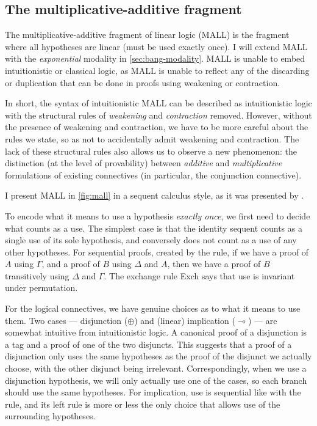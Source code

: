 \subsection{The multiplicative-additive fragment}

The multiplicative-additive fragment of linear logic (MALL) is the fragment
where all hypotheses are linear (must be used exactly once).
I will extend MALL with the \emph{exponential} modality in
\cref{sec:bang-modality}.
MALL is unable to embed intuitionistic or classical logic, as MALL is unable to
reflect any of the discarding or duplication that can be done in proofs using
weakening or contraction.

In short, the syntax of intuitionistic MALL can be described as intuitionistic
logic with the structural rules of \emph{weakening} and \emph{contraction}
removed.
However, without the presence of weakening and contraction, we have to be more
careful about the rules we state, so as not to accidentally admit weakening
and contraction.
The lack of these structural rules also allows us to observe a new phenomenon:
the distinction (at the level of provability) between \emph{additive} and
\emph{multiplicative} formulations of existing connectives (in particular, the
conjunction connective).

I present MALL in \cref{fig:mall} in a sequent calculus style, as it was
presented by \citet{girard87linear}.

To encode what it means to use a hypothesis \emph{exactly once}, we first need
to decide what counts as a use.
The simplest case is that the identity sequent counts as a single use of its
sole hypothesis, and conversely does not count as a use of any other hypotheses.
For sequential proofs, created by the  rule, if we have a proof of
$A$ using $\Gamma$, and a proof of $B$ using $\Delta$ and $A$, then we have a
proof of $B$ transitively using $\Delta$ and $\Gamma$.
The exchange rule Exch says that use is invariant under permutation.

For the logical connectives, we have genuine choices as to what it means to use
them.
Two cases --- disjunction ($\oplus$) and (linear) implication ($\multimap$) ---
are somewhat intuitive from intuitionistic logic.
A canonical proof of a disjunction is a tag and a proof of one of the two
disjuncts.
This suggests that a proof of a disjunction only uses the same hypotheses as
the proof of the disjunct we actually choose, with the other disjunct being
irrelevant.
Correspondingly, when we use a disjunction hypothesis, we will only actually use
one of the cases, so each branch should use the same hypotheses.
For implication, use is sequential like with the  rule, and its
left rule is more or less the only choice that allows use of the surrounding
hypotheses.

